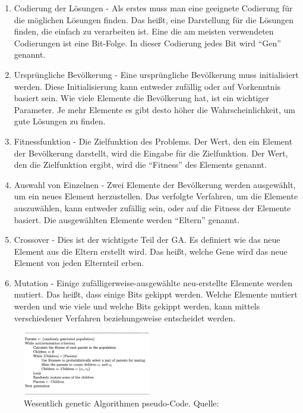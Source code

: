 \documentclass[twoside,twocolumn]{article}
\begin{document}
\begin{enumerate}
\item{Codierung der Lösungen - Als erstes muss man eine geeignete Codierung für die möglichen Lösungen finden. Das heißt, eine Darstellung für die Lösungen finden, die einfach zu verarbeiten ist. Eine die am meisten verwendeten Codierungen ist eine Bit-Folge. In dieser Codierung jedes Bit wird \enquote{Gen} genannt.}
\item{Ursprüngliche Bevölkerung - Eine ursprüngliche Bevölkerung muss initialisiert werden. Diese Initialisierung kann entweder zufällig oder auf Vorkenntnis basiert sein. Wie viele Elemente die Bevölkerung hat, ist ein wichtiger Parameter. Je mehr Elemente es gibt desto höher die Wahrscheinlichkeit, um gute Lösungen zu finden.}
\item{Fitnessfunktion - Die Zielfunktion des Problems. Der Wert, den ein Element der Bevölkerung darstellt, wird die Eingabe für die Zielfunktion. Der Wert, den die Zielfunktion ergibt, wird die \enquote{Fitness} des Elements genannt.}
\item{Auswahl von Einzelnen - Zwei Elemente der Bevölkerung werden ausgewählt, um ein neues Element herzustellen. Das verfolgte Verfahren, um die Elemente auszuwählen, kann entweder zufällig sein, oder auf die Fitness der Elemente basiert. Die ausgewählten Elemente werden \enquote{Eltern} genannt.}
\item{Crossover - Dies ist der wichtigste Teil der GA. Es definiert wie das neue Element aus die Eltern erstellt wird. Das heißt, welche Gene wird das neue Element von jeden Elternteil erben.}
\item{Mutation - Einige zufälligerweise-ausgewählte neu-erstellte Elemente werden mutiert. Das heißt, dass einige Bits gekippt werden. Welche Elemente mutiert werden und wie viele und welche Bits gekippt werden, kann mittels verschiedener Verfahren beziehungsweise entscheidet werden.}
\end{enumerate}

\begin{figure}
\caption{Wesentlich genetic Algorithmen pseudo-Code. Quelle: \cite{wiley_evolutionary}}
\label{fig:ga_pseudo}
\centering
\includegraphics[width=0.5\textwidth]{images/ga_pseudo.png}
\end{figure}
\end{document}
